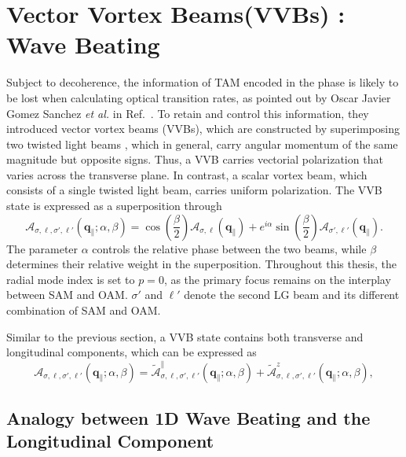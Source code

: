 %
%
%
%
%
\section{Vector Vortex Beams(VVBs) : Wave Beating}

Subject to decoherence, the information of TAM encoded in the phase is likely to be lost when calculating optical transition rates, as pointed out by Oscar Javier Gomez Sanchez \textit{et al.} in Ref.~\cite{sanchez2024enhanced}. To retain and control this information, they introduced vector vortex beams (VVBs), which are constructed by superimposing two twisted light beams , which in general, carry angular momentum of the same magnitude but opposite signs. Thus, a VVB carries vectorial polarization that varies across the transverse plane. In contrast, a scalar vortex beam, which consists of a single twisted light beam, carries uniform polarization. The VVB state is expressed as a superposition through
\begin{equation}
\boldsymbol{\mathcal{A}}_{\sigma, \ell, \sigma', \ell'}(\boldsymbol{q}_\parallel;\alpha,\beta)
=
\cos{\left(\frac{\beta}{2}\right)}
\boldsymbol{\mathcal{A}}_{\sigma, \ell}(\boldsymbol{q}_\parallel)
+
e^{i \alpha}
\sin{\left(\frac{\beta}{2}\right)}
\boldsymbol{\mathcal{A}}_{\sigma', \ell'}(\boldsymbol{q}_\parallel).
\end{equation}
The parameter $\alpha$ controls the relative phase between the two beams, while $\beta$ determines their relative weight in the superposition.  Throughout this thesis, the radial mode index is set to $p=0$, as the primary focus remains on the interplay between SAM and OAM. $\sigma'$ and $\ell'$ denote the second LG beam and its different combination of SAM and OAM.

Similar to the previous section, a VVB state contains both transverse and longitudinal components, which can be expressed as
\begin{equation}
\boldsymbol{\mathcal{A}}_{\sigma, \ell, \sigma', \ell'}(\boldsymbol{q}_\parallel;\alpha,\beta)
= \boldsymbol{\tilde{\mathcal{A}}}_{\sigma, \ell, \sigma', \ell'}^\parallel(\boldsymbol{q}_\parallel;\alpha,\beta)
+ \boldsymbol{\tilde{\mathcal{A}}}_{\sigma, \ell, \sigma', \ell'}^z(\boldsymbol{q}_\parallel;\alpha,\beta),
\end{equation}

\subsection{Analogy between 1D Wave Beating and the Longitudinal Component}

